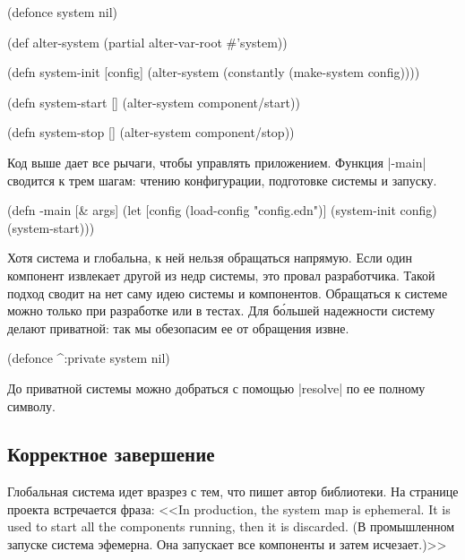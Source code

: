 \begin{english}
  \begin{clojure}
(defonce system nil)

(def alter-system (partial alter-var-root #'system))

(defn system-init [config]
  (alter-system (constantly (make-system config))))

(defn system-start []
  (alter-system component/start))

(defn system-stop []
  (alter-system component/stop))
  \end{clojure}
\end{english}

Код выше дает все рычаги, чтобы управлять приложением. Функция \spverb|-main|
сводится к трем шагам: чтению конфигурации, подготовке системы и запуску.

\begin{english}
  \begin{clojure}
(defn -main [& args]
  (let [config (load-config "config.edn")]
    (system-init config)
    (system-start)))
  \end{clojure}
\end{english}

Хотя система и глобальна, к ней нельзя обращаться напрямую. Если один компонент
извлекает другой из недр системы, это провал разработчика. Такой подход сводит
на нет саму идею системы и компонентов. Обращаться к системе можно только при
разработке или в тестах. Для б\'{о}льшей надежности систему делают приватной:
так мы обезопасим ее от обращения извне.

\begin{english}
  \begin{clojure}
(defonce ^:private system nil)
  \end{clojure}
\end{english}

До приватной системы можно добраться с помощью \spverb|resolve| по ее полному
символу.

\subsection{Корректное завершение}

Глобальная система идет вразрез с тем, что пишет автор библиотеки. На странице
проекта встречается фраза: <<In production, the system map is ephemeral. It is
used to start all the components running, then it is discarded. (В промышленном
запуске система эфемерна. Она запускает все компоненты и затем исчезает.)>>

